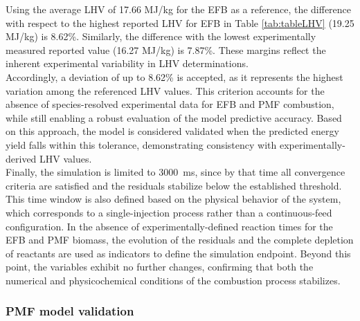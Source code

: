 \documentclass[preprint,12pt]{elsarticle}
\begin{document}

Using the average LHV of 17.66 MJ/kg for the EFB as a reference, the difference with respect to the highest reported LHV for EFB in Table \ref{tab:tableLHV} (19.25 MJ/kg) is 8.62\%. Similarly, the difference with the lowest experimentally measured reported value (16.27 MJ/kg) is 7.87\%. These margins reflect the inherent experimental variability in LHV determinations. \\


Accordingly, a deviation of up to 8.62\% is accepted, as it represents the highest variation among the referenced LHV values. This criterion accounts for the absence of species-resolved experimental data for EFB and PMF combustion, while still enabling a robust evaluation of the model predictive accuracy. Based on this approach, the model is considered validated when the predicted energy yield falls within this tolerance, demonstrating consistency with experimentally-derived LHV values. \\

Finally, the simulation is limited to 3000~ms, since by that time all convergence criteria are satisfied and the residuals stabilize below the established threshold. This time window is also defined based on the physical behavior of the system, which corresponds to a single-injection process rather than a continuous-feed configuration. In the absence of experimentally-defined reaction times for the EFB and PMF biomass, the evolution of the residuals and the complete depletion of reactants are used as indicators to define the simulation endpoint. Beyond this point, the variables exhibit no further changes, confirming that both the numerical and physicochemical conditions of the combustion process stabilizes.

\subsubsection{PMF model validation}
\end{document}
